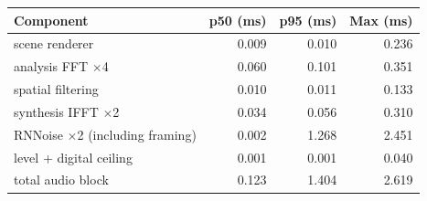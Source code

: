 \begin{center}\small\begin{tabular}{@{}lrrr@{}}\toprule Component & p50 (ms) & p95 (ms) & Max (ms)\\\midrule
scene renderer & 0.009 & 0.010 & 0.236 \\
analysis FFT $\times$4 & 0.060 & 0.101 & 0.351 \\
spatial filtering & 0.010 & 0.011 & 0.133 \\
synthesis IFFT $\times$2 & 0.034 & 0.056 & 0.310 \\
RNNoise $\times$2 (including framing) & 0.002 & 1.268 & 2.451 \\
level + digital ceiling & 0.001 & 0.001 & 0.040 \\
total audio block & 0.123 & 1.404 & 2.619 \\\bottomrule\end{tabular}\end{center}